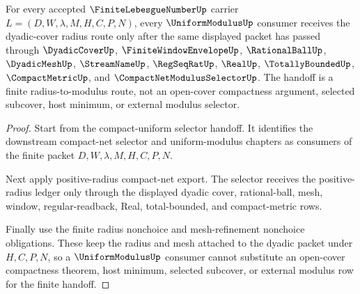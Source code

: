 \begin{theorem}
\label{thm:finite-lebesgue-number-dyadic-cover-uniform-modulus-handoff}
For every accepted $\FiniteLebesgueNumberUp$ carrier $L=(D,W,\lambda,M,H,C,P,N)$, every $\UniformModulusUp$ consumer receives the dyadic-cover radius route only after the same displayed packet has passed through $\DyadicCoverUp$, $\FiniteWindowEnvelopeUp$, $\RationalBallUp$, $\DyadicMeshUp$, $\StreamNameUp$, $\RegSeqRatUp$, $\RealUp$, $\TotallyBoundedUp$, $\CompactMetricUp$, and $\CompactNetModulusSelectorUp$. The handoff is a finite radius-to-modulus route, not an open-cover compactness argument, selected subcover, host minimum, or external modulus selector.
\end{theorem}
\begin{proof}
Start from the compact-uniform selector handoff. It identifies the downstream compact-net selector and uniform-modulus chapters as consumers of the finite packet $D,W,\lambda,M,H,C,P,N$.

Next apply positive-radius compact-net export. The selector receives the positive-radius ledger only through the displayed dyadic cover, rational-ball, mesh, window, regular-readback, Real, total-bounded, and compact-metric rows.

Finally use the finite radius nonchoice and mesh-refinement nonchoice obligations. These keep the radius and mesh attached to the dyadic packet under $H,C,P,N$, so a $\UniformModulusUp$ consumer cannot substitute an open-cover compactness theorem, host minimum, selected subcover, or external modulus row for the finite handoff.
\end{proof}

